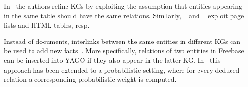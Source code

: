 In~\cite{ref20} the authors refine KGs by exploiting the assumption that entities appearing in the same table should have the same relations. Similarly, ~\cite{ref21} and ~\cite{ref22} exploit page lists and HTML tables, resp.

Instead of documents, interlinks between the same entities in different KGs can be used to add new facts~\cite{ref23, ref24}. More specifically, relations of two entities in Freebase can be inserted into YAGO if they also appear in the latter KG. In~\cite{ref25} this approach has been extended to a probabilistic setting, where for every deduced relation a corresponding probabilistic weight is computed.